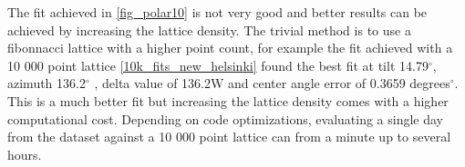\begin{figure}[h]
\begin{floatrow}
\end{floatrow}
\end{figure}

The fit achieved in \ref{fig_polar10} is not very good and better results can be achieved by increasing the lattice density. The trivial method is to use a fibonnacci lattice with a higher point count, for example the fit achieved with a 10 000 point lattice \ref{10k_fits_new_helsinki} found the best fit at tilt 14.79$^\circ$, azimuth 136.2$^\circ$ , delta value of 136.2W and center angle error of 0.3659 degrees$^\circ$. This is a much better fit but increasing the lattice density comes with a higher computational cost. Depending on code optimizations, evaluating a single day from the dataset against a 10 000 point lattice can from a minute up to several hours.

